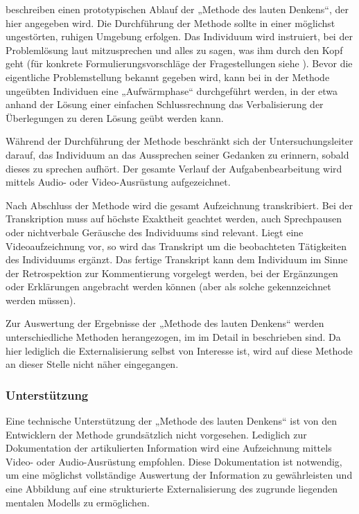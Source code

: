 \citet{Van-Someren94} beschreiben einen prototypischen Ablauf der „Methode des lauten Denkens“, der hier angegeben wird. Die Durchführung der Methode sollte in einer möglichst ungestörten, ruhigen Umgebung erfolgen. Das Individuum wird instruiert, bei der Problemlösung laut mitzusprechen und alles zu sagen, was ihm durch den Kopf geht (für konkrete Formulierungsvorschläge der Fragestellungen siehe \citep[][S. 43]{Van-Someren94}). Bevor die eigentliche Problemstellung bekannt gegeben wird, kann bei in der Methode ungeübten Individuen eine „Aufwärmphase“ durchgeführt werden, in der etwa anhand der Lösung einer einfachen Schlussrechnung das Verbalisierung der Überlegungen zu deren Lösung geübt werden kann.

Während der Durchführung der Methode beschränkt sich der Untersuchungsleiter darauf, das Individuum an das Aussprechen seiner Gedanken zu erinnern, sobald dieses zu sprechen aufhört. Der gesamte Verlauf der Aufgabenbearbeitung wird mittels Audio- oder Video-Ausrüstung aufgezeichnet.

Nach Abschluss der Methode wird die gesamt Aufzeichnung transkribiert. Bei der Transkription muss auf höchste Exaktheit geachtet werden, auch Sprechpausen oder nichtverbale Geräusche des Individuums sind relevant. Liegt eine Videoaufzeichnung vor, so wird das Transkript um die beobachteten Tätigkeiten des Individuums ergänzt. Das fertige Transkript kann dem Individuum im Sinne der Retrospektion zur Kommentierung vorgelegt werden, bei der Ergänzungen oder Erklärungen angebracht werden können (aber als solche gekennzeichnet werden müssen).

Zur Auswertung der Ergebnisse der „Methode des lauten Denkens“ werden unterschiedliche Methoden herangezogen, im im Detail in \citep{Van-Someren94} beschrieben sind. Da hier lediglich die Externalisierung selbst von Interesse ist, wird auf diese Methode an dieser Stelle nicht näher eingegangen.

\subsubsection{Unterstützung}

Eine technische Unterstützung der „Methode des lauten Denkens“ ist von den Entwicklern der Methode \citep{Van-Someren94} grundsätzlich nicht vorgesehen. Lediglich zur Dokumentation der artikulierten Information wird eine Aufzeichnung mittels Video- oder Audio-Ausrüstung empfohlen. Diese Dokumentation ist notwendig, um eine möglichst vollständige Auswertung der Information zu gewährleisten und eine Abbildung auf eine strukturierte Externalisierung des zugrunde liegenden mentalen Modells zu ermöglichen. 

